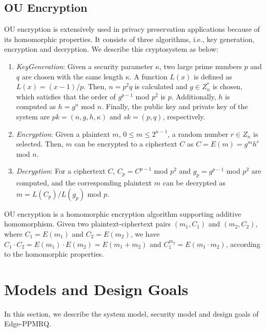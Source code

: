 \documentclass[IEEE JOURNAL OF BIOMEDICAL AND HEALTH INFORMATICS]{IEEEtran}
\begin{document}
\subsection{OU Encryption}
OU encryption is extensively used in privacy preservation applications because of its homomorphic properties. It consists of three algorithms, i.e., key generation, encryption and decryption. We describe this cryptosystem as below:
\begin{enumerate}
	\item \emph{KeyGeneration}: Given a security parameter $\kappa$, two large prime numbers $p$ and $q$ are chosen with the same length $\kappa$. A function $L(x)$ is defined as $L(x)=(x-1)/p$. Then,  $n=p^2q$ is calculated and $g\in Z_n^{*}$ is chosen, which satisfies that the order of $g^{p-1}$ mod $p^2$ is $p$. Additionally, $h$ is computed as $h=g^n$ mod $n$. Finally, the public key and private key of the system are $pk=(n, g, h, \kappa)$ and $sk=(p, q)$, respectively.  
	\item \emph{Encryption}: Given a plaintext $m$, $0\le m \le 2^{\kappa-1}$, a random number $r \in Z_n$ is selected. Then, $m$ can be encrypted to a ciphertext $C$ as $C=E(m)=g^mh^r$ mod $n$.
	\item \emph{Decryption}: For a ciphertext $C$, $C_p=C^{p-1}$ mod $p^2$ and $g_p=g^{p-1}$ mod $p^2$ are computed, and the corresponding plaintext $m$ can be decrypted as $m=L(C_p)/L(g_p)$ mod $p$.
\end{enumerate}

OU encryption is a homomorphic encryption algorithm supporting additive homomorphism. Given two plaintext-ciphertext pairs $(m_1, C_1)$ and $(m_2, C_2)$, where $C_1=E(m_1) $ and $ C_2=E(m_2)$, we have $C_1  \cdot  C_2 = E(m_1) \cdot E(m_2) = E(m_1 + m_2)$ and $C_1^{m_2}=E(m_1 \cdot m_2)$, according to the homomorphic properties.

\section{Models and Design Goals}
In this section, we describe the system model, security model and design goals of Edge-PPMRQ.
\end{document}
